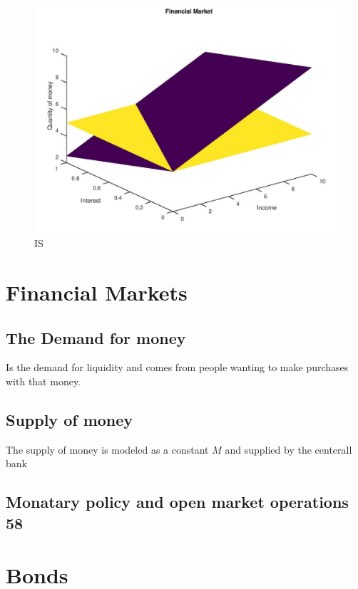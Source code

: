 \documentclass{tufte-book}
\begin{document}
\begin{figure}
\centering
\includegraphics[width=\textwidth,height=1\textwidth]{pics/IS.jpg}
\caption{IS}
\end{figure}\hypertarget{financial-markets}{%
\section{Financial Markets}\label{financial-markets}}

\hypertarget{the-demand-for-money}{%
\subsection{The Demand for money}\label{the-demand-for-money}}

Is the demand for liquidity and comes from people wanting to make
purchases with that money.

\hypertarget{supply-of-money}{%
\subsection{Supply of money}\label{supply-of-money}}

The supply of money is modeled as a constant \(M\) and supplied by the
centerall bank

\hypertarget{monatary-policy-and-open-market-operations-58}{%
\subsection{Monatary policy and open market operations
58}\label{monatary-policy-and-open-market-operations-58}}\hypertarget{bonds}{%
\section{Bonds}\label{bonds}}
\end{document}

